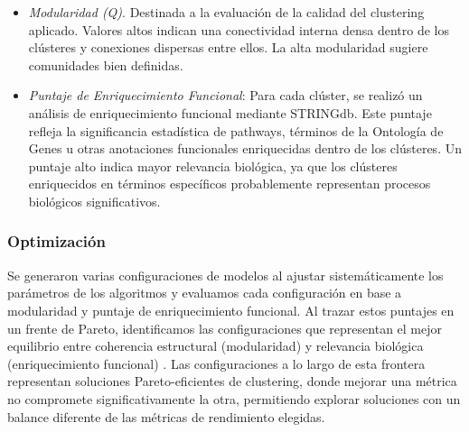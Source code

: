 \begin{itemize}
	\item \textit{Modularidad (Q)}. Destinada a la evaluación de la calidad del clustering aplicado. Valores altos indican una conectividad interna densa dentro de los clústeres y conexiones dispersas entre ellos. La alta modularidad sugiere comunidades bien definidas.
	
	\item \textit{Puntaje de Enriquecimiento Funcional}: Para cada clúster, se realizó un análisis de enriquecimiento funcional mediante STRINGdb. Este puntaje refleja la significancia estadística de pathways, términos de la Ontología de Genes u otras anotaciones funcionales enriquecidas dentro de los clústeres. Un puntaje alto indica mayor relevancia biológica, ya que los clústeres enriquecidos en términos específicos probablemente representan procesos biológicos significativos.
\end{itemize}


\subsubsection*{Optimización}
Se generaron varias configuraciones de modelos al ajustar sistemáticamente los parámetros de los algoritmos y evaluamos cada configuración en base a modularidad y puntaje de enriquecimiento funcional. Al trazar estos puntajes en un frente de Pareto, identificamos las configuraciones que representan el mejor equilibrio entre coherencia estructural (modularidad) y relevancia biológica (enriquecimiento funcional) \cite{goodarzi2014PARETOFRONT1,jahan2013multiPARETOFRONT2,costa2015paretoPARETOFRONT3}. Las configuraciones a lo largo de esta frontera representan soluciones Pareto-eficientes de clustering, donde mejorar una métrica no compromete significativamente la otra, permitiendo explorar soluciones con un balance diferente de las métricas de rendimiento elegidas.


